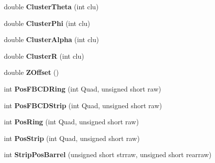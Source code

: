 \begin{DoxyCompactItemize}
\item 
\hypertarget{class_calibration_af66b845428db545238c5a49d5edadccd}{double {\bfseries Cluster\-Theta} (int clu)}\label{class_calibration_af66b845428db545238c5a49d5edadccd}

\item 
\hypertarget{class_calibration_a7d041b9f530257c9f717bcaaaef4b200}{double {\bfseries Cluster\-Phi} (int clu)}\label{class_calibration_a7d041b9f530257c9f717bcaaaef4b200}

\item 
\hypertarget{class_calibration_ad2ead82be397c3017dd98e490232abd2}{double {\bfseries Cluster\-Alpha} (int clu)}\label{class_calibration_ad2ead82be397c3017dd98e490232abd2}

\item 
\hypertarget{class_calibration_ae30896b904d2d041f4b76effe283bc93}{double {\bfseries Cluster\-R} (int clu)}\label{class_calibration_ae30896b904d2d041f4b76effe283bc93}

\item 
\hypertarget{class_calibration_ada9c3b036839143214a5e41b90f2a78e}{double {\bfseries Z\-Offset} ()}\label{class_calibration_ada9c3b036839143214a5e41b90f2a78e}

\item 
\hypertarget{class_calibration_a65ab7c201643a2bc8cb366b9ac20ab3b}{int {\bfseries Pos\-F\-B\-C\-D\-Ring} (int Quad, unsigned short raw)}\label{class_calibration_a65ab7c201643a2bc8cb366b9ac20ab3b}

\item 
\hypertarget{class_calibration_a9ee9ef612f7485f5371916bf524bb036}{int {\bfseries Pos\-F\-B\-C\-D\-Strip} (int Quad, unsigned short raw)}\label{class_calibration_a9ee9ef612f7485f5371916bf524bb036}

\item 
\hypertarget{class_calibration_a240b3ac33e55af3f762d2cecc5d06b2b}{int {\bfseries Pos\-Ring} (int Quad, unsigned short raw)}\label{class_calibration_a240b3ac33e55af3f762d2cecc5d06b2b}

\item 
\hypertarget{class_calibration_a1d12aea9e2be55852b937e8be3ffbae1}{int {\bfseries Pos\-Strip} (int Quad, unsigned short raw)}\label{class_calibration_a1d12aea9e2be55852b937e8be3ffbae1}

\item 
\hypertarget{class_calibration_af2ce93c038cdfd3e9fb1e4ffa093097c}{int {\bfseries Strip\-Pos\-Barrel} (unsigned short strraw, unsigned short rearraw)}\label{class_calibration_af2ce93c038cdfd3e9fb1e4ffa093097c}

\end{DoxyCompactItemize}
